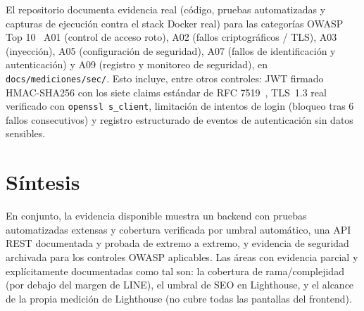 El repositorio documenta evidencia real (c\'odigo, pruebas automatizadas y
capturas de ejecuci\'on contra el stack Docker real) para las categor\'ias
OWASP Top 10~\parencite{owasp-top10} A01 (control de acceso roto), A02 (fallos
criptogr\'aficos / TLS), A03 (inyecci\'on), A05 (configuraci\'on de
seguridad), A07 (fallos de identificaci\'on y autenticaci\'on) y A09
(registro y monitoreo de seguridad), en \texttt{docs/mediciones/sec/}. Esto
incluye, entre otros controles: JWT firmado HMAC-SHA256 con los siete
claims est\'andar de RFC 7519~\parencite{rfc7519}, TLS~1.3 real verificado con
\texttt{openssl s\_client}, limitaci\'on de intentos de login (bloqueo tras
6 fallos consecutivos) y registro estructurado de eventos de autenticaci\'on
sin datos sensibles.

\section{S\'intesis}
\label{sec:sintesis-resultados}

En conjunto, la evidencia disponible muestra un backend con pruebas
automatizadas extensas y cobertura verificada por umbral autom\'atico, una
API REST documentada y probada de extremo a extremo, y evidencia de
seguridad archivada para los controles OWASP aplicables. Las \'areas con
evidencia parcial y expl\'icitamente documentadas como tal son: la
cobertura de rama/complejidad (por debajo del margen de LINE), el umbral
de SEO en Lighthouse, y el alcance de la propia medici\'on de Lighthouse
(no cubre todas las pantallas del frontend).
